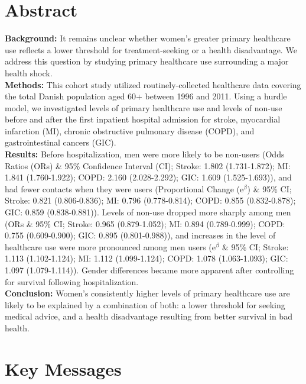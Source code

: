 \section{Abstract}
\textbf{Background:} It remains unclear whether women's greater primary healthcare 
use reflects a lower threshold for treatment-seeking or a health disadvantage. We 
address this question by studying primary healthcare use surrounding a major health 
shock.\\
\textbf{Methods:} This cohort study utilized routinely-collected healthcare data 
covering the total Danish population aged 60+ between 1996 and 2011. Using a hurdle 
model, we investigated levels of primary healthcare use and levels of non-use before 
and after the first inpatient hospital admission for stroke, myocardial infarction (MI), 
chronic obstructive pulmonary disease (COPD), and gastrointestinal cancers (GIC).\\
\textbf{Results:} Before hospitalization, men were more likely to be non-users (Odds 
Ratios (ORs) \& 95\% Confidence Interval (CI); Stroke: 1.802 (1.731-1.872); MI: 1.841 
(1.760-1.922); COPD: 2.160 (2.028-2.292); GIC: 1.609 (1.525-1.693)), and had fewer 
contacts when they were users (Proportional Change ($\mathrm{e}^\beta$) \& 95\% CI; Stroke: 0.821 
(0.806-0.836); MI: 0.796 (0.778-0.814); COPD: 0.855 (0.832-0.878); GIC: 0.859 
(0.838-0.881)). Levels of non-use dropped more sharply among men (ORs \& 95\% CI; 
Stroke: 0.965 (0.879-1.052); MI: 0.894 (0.789-0.999); COPD: 0.755 (0.609-0.900); 
GIC: 0.895 (0.801-0.988)), and increases in the level of healthcare use were more  
pronounced among men users ($\mathrm{e}^\beta$ \& 95\% CI; Stroke: 1.113 (1.102-1.124); MI: 1.112 
(1.099-1.124); COPD: 1.078 (1.063-1.093); GIC: 1.097 (1.079-1.114)). Gender differences 
became more apparent after controlling for survival following hospitalization.\\
\textbf{Conclusion:} Women's consistently higher levels of primary healthcare use are 
likely to be explained by a combination of both: a lower threshold for seeking medical 
advice, and a health disadvantage resulting from better survival in bad health.\\




\newpage

\section{Key Messages}

